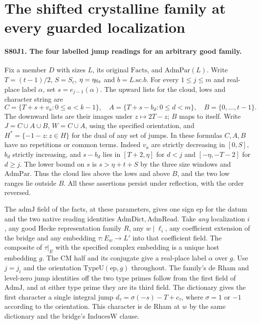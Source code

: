 \section{The shifted crystalline family at every guarded localization}

\paragraph{S80J1. The four labelled jump readings for an arbitrary good family.}
Fix a member $D$ with sizes $L$, its original $\mathrm{Facts}$,
and $\mathrm{AdmPar}(L)$. Write $T=(t-1)/2$, $S=S_c$,
$\eta=\eta_{\rm Sz}$ and $b=L.\mathrm{sc}.b$. For every
$1\le j\le m$ and real-place label $\alpha$, set $s=e_{j-1}(\alpha)$.
The upward lists for the cloud, lows and character string are
\[
 C=\{T+s+v_a:0\le a<k-1\},\quad
 A=\{T+s-b_d:0\le d<m\},\quad B=\{0,\ldots,t-1\}.
\]
The downward lists are their images under $z\mapsto2T-z$;
$B$ maps to itself. Write $J=C\cup A\cup B$, $W=C\cup A$,
using the specified orientation, and $H^*=\{-1-z:z\in H\}$ for
the dual of any set of jumps. In these formulas $C,A,B$ have no
repetitions or common terms. Indeed $v_a$ are strictly decreasing in
$[0,S]$, $b_d$ strictly increasing, and $s-b_d$ lies in
$[T+2,\eta]$ for $d<j$ and $[-\eta,-T-2]$ for $d\ge j$.
The lower bound on $s$ is $s>\eta+t+S$ by the three size windows and
$\mathrm{AdmPar}$. Thus the cloud lies above the lows and above $B$,
and the two low ranges lie outside $B$. All these assertions persist
under reflection, with the order reversed.

The $\mathrm{admJ}$ field of the facts, at these parameters, gives
one sign $\mathrm{ep}$ for the datum and the two native reading
identities $\mathrm{AdmDict},\mathrm{AdmRead}$. Take \emph{any}
localization $i$, any good Hecke representation family $R$, any
$w\mid\ell_i$, any coefficient extension of the bridge and any
embedding $\tau:E_w\to L'$ into that coefficient field. The composite
of $\tau|_E$ with the specified complex embedding is a unique host
embedding $g$. The CM half and its conjugate give a real-place label
$\alpha$ over $g$. Use $j=j_i$ and the orientation
$\mathrm{TypeU}(\mathrm{ep},g)$ throughout. The family's de Rham and
level-zero jump identities off the two type primes follow from the first field of $\mathrm{AdmJ}$, and at either type prime
they are its third field. The dictionary gives the first character
a single integral jump $d_\tau=\sigma(-s)-T+c_\tau$, where
$\sigma=1$ or $-1$ according to the orientation. This character
is de Rham at $w$ by the same dictionary and the bridge's
$\mathrm{InducesW}$ clause.

